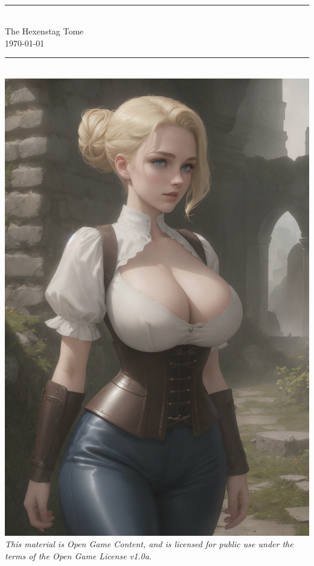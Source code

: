 \documentclass[12pt,twoside,onecolumn,openany,final]{memoir}
\begin{document}

\thispagestyle{empty}
\begin{center}
\textsc{\Large}\\[0.25cm]
\rule{\linewidth}{0.5mm} \\[0.6cm]
\fontsize{30}{30} \selectfont The Hexenstag Tome\\[.30cm]
\fontsize{16}{18} \selectfont \normalsize{\today}\\
\rule{\linewidth}{0.5mm} \\[0.6cm]
\includegraphics[scale=.37]{cover-images/eva-9-21-24.png} %
\vfill
\footnotesize{\textit{This material is Open Game Content, and is licensed for public use under the terms of the Open Game License v1.0a.}}\\
\end{center}
\end{document}
